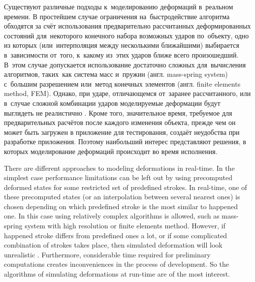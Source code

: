 \documentclass[a4paper, 12pt, titlepage]{extarticle}
\newcommand{\eng}[1]{#1}
\begin{document}
\begin{original}
    Существуют различные подходы к~моделированию деформаций в~реальном времени. В простейшем случае
    ограничения на~быстродействие алгоритма обходятся за счёт использования предварительно рассчитанных
    деформированных состояний для~некоторого конечного набора возможных ударов по~объекту, одно из которых
    (или~интерполяция между несколькими ближайшими) выбирается в~зависимости от~того, к~какому
    из~этих ударов ближе всего произошедший. В~этом случае допускается использование достаточно сложных
    для~вычисления алгоритмов, таких~как система масс и~пружин (англ. \eng{mass-spring system})
    с~большим разрешением или~метод конечных элементов (англ. \eng{finite elements method, FEM}).
    Однако, при ударе, отличающемся от~заранее рассчитанного, или в~случае сложной комбинации ударов
    моделируемые деформации будут выглядеть не реалистично \cite[раздел~2]{chang-crash}. Кроме того, значительное время, требуемое
    для предварительных расчётов после каждого изменения объекта, прежде чем он может быть загружен
    в приложение для тестирования, создаёт неудобства при разработке приложения. Поэтому наибольший
    интерес представляют решения, в которых моделирование деформаций происходит во время исполнения.
\end{original}

    There are different approaches to modeling deformations in real-time. In the simplest case
    performance limitations can be left out by using precomputed deformed states for some restricted
    set of predefined strokes. In real-time, one of these precomputed states (or an interpolation
    between several nearest ones) is chosen depending on which predefined stroke is the most similar
    to happened one. In this case using relatively complex algorithms is allowed, such as
    mass-spring system with high resolution or finite elements method. However, if happened stroke
    differs from predefined ones a lot, or if some complicated combination of strokes takes place,
    then simulated deformation will look unrealistic \cite[section~2]{chang-crash}. Furthermore,
    considerable time required for preliminary computations creates inconveniences in the process of
    development. So the algorithms of simulating deformations at run-time are of the most interest.
\end{document}
